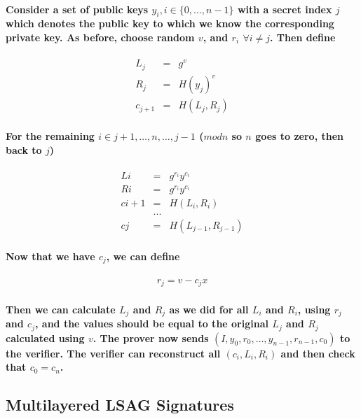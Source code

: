 \documentclass{article}
\begin{document}
\paragraph{Consider a set of public keys $y_i, i \in \{0, …, n-1\}$ with a secret index $j$ which denotes the public key to which we know the corresponding private key.  As before, choose random $v$, and $r_i$ $\forall i \ne j$.  Then define}

\begin{eqnarray}
      L_j &=& g^v\\
      R_j &=& H(y_j)^v\\
  c_{j+1} &=& H(L_j,R_j)
\end{eqnarray}

\paragraph{For the remaining $i \in {j+1, …, n, …, j-1}$ ($mod n$ so $n$ goes to zero, then back to $j$)}

\begin{eqnarray}
  Li &=& g^{r_i} y^{c_i}\\
  Ri &=& g^{r_i} y^{c_i}\\
  ci+1 &=& H(L_i,R_i)\\
  &...& \\
  cj &=& H(L_{j-1}, R_{j-1})
\end{eqnarray}

\paragraph{Now that we have $c_j$, we can define}

\begin{eqnarray}
  r_j = v - c_j x
\end{eqnarray}

\paragraph{Then we can calculate $L_j$ and $R_j$ as we did for all $L_i$ and $R_i$, using $r_j$ and $c_j$, and the values should be equal to the original $L_j$ and $R_j$ calculated using $v$. The prover now sends $(I, y_0, r_0, …, y_{n-1}, r_{n-1}, c_0)$ to the verifier.  The verifier can reconstruct all $(c_i, L_i, R_i)$ and then check that $c_0 = c_n$.}


\subsection{Multilayered LSAG Signatures}
\end{document}
